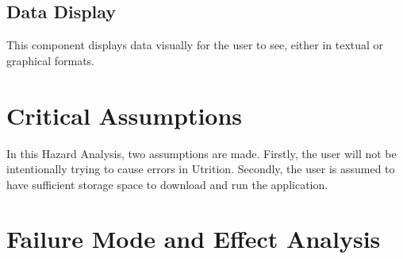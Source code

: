 \documentclass{article}
\begin{document}
\subsection{Data Display}
This component displays data visually for the user to see, either in textual or graphical formats.

\section{Critical Assumptions}


In this Hazard Analysis, two assumptions are made. Firstly, the user will not be intentionally trying to cause errors in Utrition. Secondly, the user is assumed to have sufficient storage space to download and run the application.

\section{Failure Mode and Effect Analysis}
\end{document}
